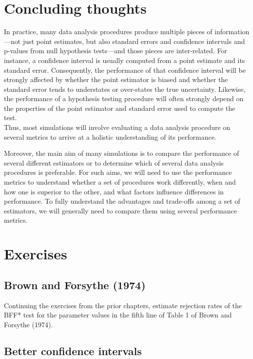 \documentclass[
]{book}
\begin{document}
\section{Concluding thoughts}\label{concluding-thoughts}

In practice, many data analysis procedures produce multiple pieces of information---not just point estimates, but also standard errors and confidence intervals and p-values from null hypothesis tests---and those pieces are inter-related.
For instance, a confidence interval is usually computed from a point estimate and its standard error.
Consequently, the performance of that confidence interval will be strongly affected by whether the point estimator is biased and whether the standard error tends to understates or over-states the true uncertainty.
Likewise, the performance of a hypothesis testing procedure will often strongly depend on the properties of the point estimator and standard error used to compute the test.\\
Thus, most simulations will involve evaluating a data analysis procedure on several metrics to arrive at a holistic understanding of its performance.

Moreover, the main aim of many simulations is to compare the performance of several different estimators or to determine which of several data analysis procedures is preferable.
For such aims, we will need to use the performance metrics to understand whether a set of procedures work differently, when and how one is superior to the other, and what factors influence differences in performance.
To fully understand the advantages and trade-offs among a set of estimators, we will generally need to compare them using several performance metrics.

\section{Exercises}\label{exercises-6}

\subsection{Brown and Forsythe (1974)}\label{Brown-Forsythe-performance}

Continuing the exercises from the prior chapters, estimate rejection rates of the BFF* test for the parameter values in the fifth line of Table 1 of Brown and Forsythe (1974).

\subsection{Better confidence intervals}\label{cluster-RCT-t-confidence-intervals}
\end{document}
